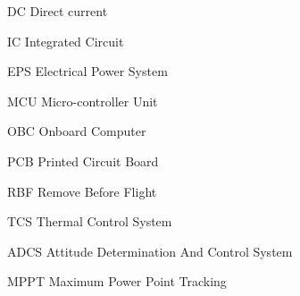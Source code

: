 \begin{abbrv}
	
	\item[DC]  Direct current
	\item[IC]  Integrated Circuit
	\item[EPS] Electrical Power System
	 \item[MCU] Micro-controller Unit
	
	\item[OBC] Onboard Computer
	\item[PCB] Printed Circuit Board 
	\item[RBF] Remove Before Flight
	\item[TCS] Thermal Control System
	
	\item[ADCS] Attitude Determination And Control System
	\item[MPPT] Maximum Power Point Tracking
\end{abbrv}

